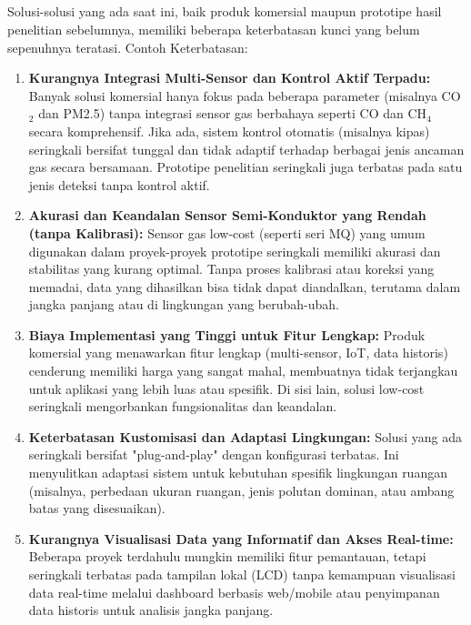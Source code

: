 \documentclass{elsinta}
\begin{document}
\subsection{\LimitationsTitle}
Solusi-solusi  yang ada saat ini, baik produk komersial maupun prototipe hasil penelitian sebelumnya, memiliki beberapa keterbatasan kunci yang belum sepenuhnya teratasi. Contoh Keterbatasan:
\begin{enumerate}
    \item \textbf{Kurangnya Integrasi Multi-Sensor dan Kontrol Aktif Terpadu:} Banyak solusi komersial hanya fokus pada beberapa parameter (misalnya CO$_2$ dan PM2.5) tanpa integrasi sensor gas berbahaya seperti CO dan CH$_4$ secara komprehensif. Jika ada, sistem kontrol otomatis (misalnya kipas) seringkali bersifat tunggal dan tidak adaptif terhadap berbagai jenis ancaman gas secara bersamaan. Prototipe penelitian seringkali juga terbatas pada satu jenis deteksi tanpa kontrol aktif.
    \item \textbf{Akurasi dan Keandalan Sensor Semi-Konduktor yang Rendah (tanpa Kalibrasi):} Sensor gas low-cost (seperti seri MQ) yang umum digunakan dalam proyek-proyek prototipe seringkali memiliki akurasi dan stabilitas yang kurang optimal. Tanpa proses kalibrasi atau koreksi yang memadai, data yang dihasilkan bisa tidak dapat diandalkan, terutama dalam jangka panjang atau di lingkungan yang berubah-ubah.
    \item \textbf{Biaya Implementasi yang Tinggi untuk Fitur Lengkap:} Produk komersial yang menawarkan fitur lengkap (multi-sensor, IoT, data historis) cenderung memiliki harga yang sangat mahal, membuatnya tidak terjangkau untuk aplikasi yang lebih luas atau spesifik. Di sisi lain, solusi low-cost seringkali mengorbankan fungsionalitas dan keandalan.
    \item \textbf{Keterbatasan Kustomisasi dan Adaptasi Lingkungan:} Solusi yang ada seringkali bersifat "plug-and-play" dengan konfigurasi terbatas. Ini menyulitkan adaptasi sistem untuk kebutuhan spesifik lingkungan ruangan (misalnya, perbedaan ukuran ruangan, jenis polutan dominan, atau ambang batas yang disesuaikan).
    \item \textbf{Kurangnya Visualisasi Data yang Informatif dan Akses Real-time:} Beberapa proyek terdahulu mungkin memiliki fitur pemantauan, tetapi seringkali terbatas pada tampilan lokal (LCD) tanpa kemampuan visualisasi data real-time melalui dashboard berbasis web/mobile atau penyimpanan data historis untuk analisis jangka panjang.
\end{enumerate}
\end{document}
